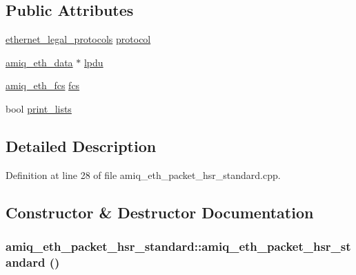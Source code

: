 \subsection*{Public Attributes}
\begin{DoxyCompactItemize}
\item 
\hyperlink{amiq__eth__types_8cpp_a37b16207afec6c164b234103e61309c4}{ethernet\_\-legal\_\-protocols} \hyperlink{classamiq__eth__packet__hsr__standard_ae6fe72549c1e9b93ab31ec552ff1e680}{protocol}
\item 
\hyperlink{amiq__eth__types_8cpp_a3595a0a508d433d383d3e5521fc0b723}{amiq\_\-eth\_\-data} $\ast$ \hyperlink{classamiq__eth__packet__hsr__standard_aa97b57d96337c895348c2676fac35d5d}{lpdu}
\item 
\hyperlink{amiq__eth__types_8cpp_adb511dc715b55539c6abdad1de981a9f}{amiq\_\-eth\_\-fcs} \hyperlink{classamiq__eth__packet__hsr__standard_ac4b90aa3ac89010f2fcfb0fb28d0d06b}{fcs}
\item 
bool \hyperlink{classamiq__eth__packet__hsr__standard_aa666ed5570f3bb6215fd613e7dc139ae}{print\_\-lists}
\end{DoxyCompactItemize}


\subsection{Detailed Description}


Definition at line 28 of file amiq\_\-eth\_\-packet\_\-hsr\_\-standard.cpp.

\subsection{Constructor \& Destructor Documentation}
\hypertarget{classamiq__eth__packet__hsr__standard_ace3c49d093728ce7571f30c3ab5d3e83}{
\subsubsection[{amiq\_\-eth\_\-packet\_\-hsr\_\-standard}]{\setlength{\rightskip}{0pt plus 5cm}amiq\_\-eth\_\-packet\_\-hsr\_\-standard::amiq\_\-eth\_\-packet\_\-hsr\_\-standard ()}}
\label{classamiq__eth__packet__hsr__standard_ace3c49d093728ce7571f30c3ab5d3e83}


